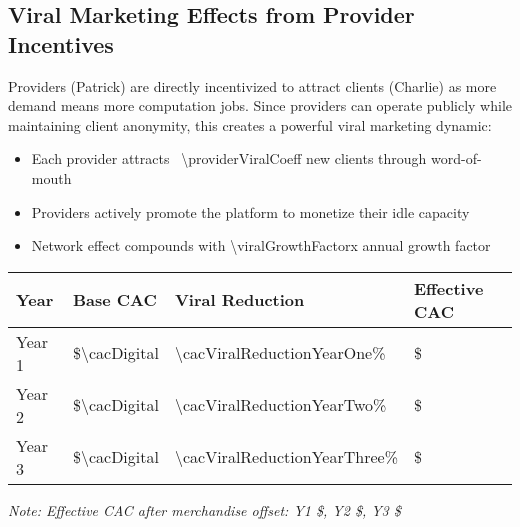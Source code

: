 \subsection{Viral Marketing Effects from Provider Incentives}
Providers (Patrick) are directly incentivized to attract clients (Charlie) as more demand means more computation jobs. Since providers can operate publicly while maintaining client anonymity, this creates a powerful viral marketing dynamic\cite{hbs2016,parker2016}:
\begin{itemize}
  \item Each provider attracts ~\num{\providerViralCoeff} new clients through word-of-mouth\cite{kumar2018}
  \item Providers actively promote the platform to monetize their idle capacity
  \item Network effect compounds with \num{\viralGrowthFactor}x annual growth factor\cite{nfx2018}
\end{itemize}

\begin{table}[H]
\centering
\begin{tabularx}{\linewidth}{l Y Y Y}
\toprule
Year & Base CAC & Viral Reduction\cite{cbinsights2021} & Effective CAC \\\midrule
Year 1 & \$\num{\cacDigital} & \num{\cacViralReductionYearOne}\% & \$\numfpeval{\effectiveCACYearOne} \\
Year 2 & \$\num{\cacDigital} & \num{\cacViralReductionYearTwo}\% & \$\numfpeval{\effectiveCACYearTwo} \\
Year 3 & \$\num{\cacDigital} & \num{\cacViralReductionYearThree}\% & \$\numfpeval{\effectiveCACYearThree} \\
\bottomrule
\end{tabularx}
\end{table}
\textit{Note: Effective CAC after merchandise offset: Y1 \$\numfpeval{\effectiveCACYearOne - \merchOffsetSubsCalc}, Y2 \$\numfpeval{\effectiveCACYearTwo - \merchOffsetSubsCalc}, Y3 \$\numfpeval{\effectiveCACYearThree - \merchOffsetSubsCalc}}